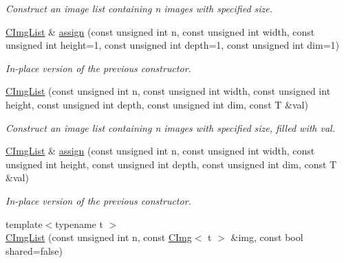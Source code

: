 \begin{DoxyCompactItemize}
\begin{DoxyCompactList}\small\item\em Construct an image list containing n images with specified size. \item\end{DoxyCompactList}\item 
\hypertarget{structcimg__library_1_1_c_img_list_a364dbd2a5ec37c6a8fe7bb0c987aa349}{
\hyperlink{structcimg__library_1_1_c_img_list}{CImgList} \& \hyperlink{structcimg__library_1_1_c_img_list_a364dbd2a5ec37c6a8fe7bb0c987aa349}{assign} (const unsigned int n, const unsigned int width, const unsigned int height=1, const unsigned int depth=1, const unsigned int dim=1)}
\label{structcimg__library_1_1_c_img_list_a364dbd2a5ec37c6a8fe7bb0c987aa349}

\begin{DoxyCompactList}\small\item\em In-\/place version of the previous constructor. \item\end{DoxyCompactList}\item 
\hypertarget{structcimg__library_1_1_c_img_list_aaa2b8d484fdb40a8c09a278fde62dd4a}{
\hyperlink{structcimg__library_1_1_c_img_list_aaa2b8d484fdb40a8c09a278fde62dd4a}{CImgList} (const unsigned int n, const unsigned int width, const unsigned int height, const unsigned int depth, const unsigned int dim, const T \&val)}
\label{structcimg__library_1_1_c_img_list_aaa2b8d484fdb40a8c09a278fde62dd4a}

\begin{DoxyCompactList}\small\item\em Construct an image list containing n images with specified size, filled with val. \item\end{DoxyCompactList}\item 
\hypertarget{structcimg__library_1_1_c_img_list_a212d98ed848351cf4f23910e717a4878}{
\hyperlink{structcimg__library_1_1_c_img_list}{CImgList} \& \hyperlink{structcimg__library_1_1_c_img_list_a212d98ed848351cf4f23910e717a4878}{assign} (const unsigned int n, const unsigned int width, const unsigned int height, const unsigned int depth, const unsigned int dim, const T \&val)}
\label{structcimg__library_1_1_c_img_list_a212d98ed848351cf4f23910e717a4878}

\begin{DoxyCompactList}\small\item\em In-\/place version of the previous constructor. \item\end{DoxyCompactList}\item 
\hypertarget{structcimg__library_1_1_c_img_list_adca9eb5550fdba450571786c433857e3}{
{\footnotesize template$<$typename t $>$ }\\\hyperlink{structcimg__library_1_1_c_img_list_adca9eb5550fdba450571786c433857e3}{CImgList} (const unsigned int n, const \hyperlink{structcimg__library_1_1_c_img}{CImg}$<$ t $>$ \&img, const bool shared=false)}
\label{structcimg__library_1_1_c_img_list_adca9eb5550fdba450571786c433857e3}


\end{DoxyCompactItemize}
